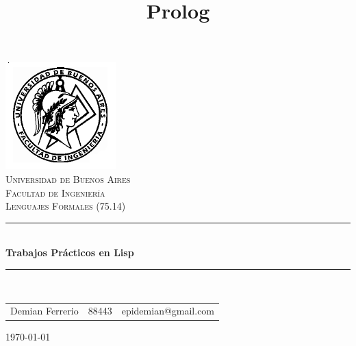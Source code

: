 \documentclass[12pt,titlepage]{article}
\begin{document}


\pagestyle{fancy}
\renewcommand{\sectionmark}[1]{\markboth{}{\thesection\ \ #1}}
\lhead{}
\chead{}
\rhead{\rightmark}
\lfoot{}
\cfoot{}
\rfoot{\thepage}



\title{Prolog}
\author{}



\begin{titlepage}

\thispagestyle{empty}

\begin{center}
\includegraphics[scale=0.55]{./fiuba}\\
\textsc{\Large Universidad de Buenos Aires}\\[0.2cm]
\textsc{\Large Facultad de Ingeniería}\\[1.5cm]


\textsc{\large Lenguajes Formales (75.14)} \\[0.3cm]

\rule{\linewidth}{0.5mm} \\[0.4cm]
{\huge \bfseries Trabajos Prácticos en Lisp} \\
\rule{\linewidth}{0.5mm} \\[1cm]

\vfill

\Large 
\begin{tabular}{lll}
Demian Ferrerio & 88443 & epidemian@gmail.com \\[0.5cm]
\end{tabular}

{\Large \today}

\end{center}
\end{titlepage}
\end{document}
